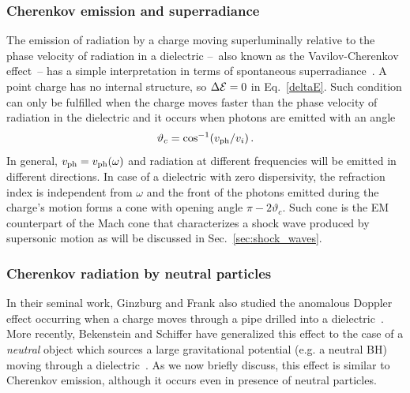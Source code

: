 \documentclass[11pt]{article}
\numberwithin{equation}{section} %
\begin{document}
\subsubsection{Cherenkov emission and superradiance\label{sec:cherenkov}}
The emission of radiation by a charge moving superluminally relative to the phase velocity of radiation in a dielectric --~also known as the Vavilov-Cherenkov effect~-- has a simple interpretation in terms of spontaneous superradiance~\cite{Ginzburg:2005}. A point charge has no internal structure, so $\Delta {\cal E}=0$ in Eq.~\eqref{deltaE}. Such condition can only be fulfilled when the charge moves faster than the phase velocity of radiation in the dielectric and it occurs when photons are emitted with an angle
\begin{equation}
 \vartheta_c=\cos^{-1}(v_{\rm ph}/v_i)\,.
\end{equation}
In general, $v_{\rm ph}=v_{\rm ph}(\omega)$ and radiation at different frequencies will be emitted in different 
directions. In case of a dielectric with zero dispersivity, the refraction index is independent from $\omega$ and the 
front of the photons emitted during the charge's motion forms a cone with opening angle $\pi-2\vartheta_c$. Such cone is 
the EM counterpart of the Mach cone that characterizes a shock wave produced by supersonic motion as will be discussed 
in Sec.~\ref{sec:shock_waves}. 

\subsubsection{Cherenkov radiation by neutral particles}
In their seminal work, Ginzburg and Frank also studied the anomalous Doppler effect occurring when a charge moves through a pipe drilled into a dielectric~\cite{Ginzburg:1945zz,Ginzburg:1947}. More recently, Bekenstein and Schiffer have generalized this effect to the case of a \emph{neutral} object which sources a large gravitational potential (e.g. a neutral BH) moving through a dielectric~\cite{Bekenstein:1998nt}. As we now briefly discuss, this effect is similar to Cherenkov emission, although it occurs even in presence of neutral particles. 
\end{document}
